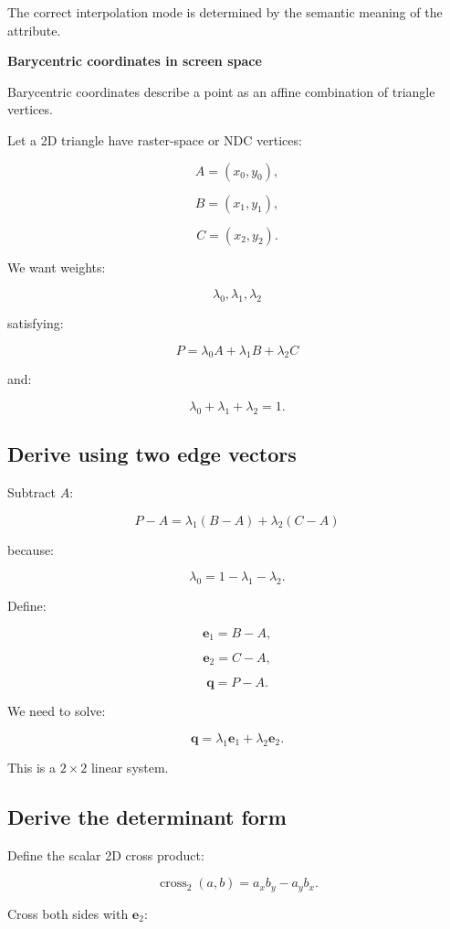 The correct interpolation mode is determined by the semantic meaning of the attribute.

\textbf{Barycentric coordinates in screen space}

Barycentric coordinates describe a point as an affine combination of triangle vertices.

Let a 2D triangle have raster-space or NDC vertices:

\[
 A=(x_0,y_0),
\]

\[
 B=(x_1,y_1),
\]

\[
 C=(x_2,y_2).
\]

We want weights:

\[
 \lambda_0,\lambda_1,\lambda_2
\]

satisfying:

\[
 \boxed{ P=\lambda_0A+\lambda_1B+\lambda_2C }
\]

and:

\[
 \boxed{ \lambda_0+\lambda_1+\lambda_2=1 }.
\]

\subsection{Derive using two edge vectors}\label{02-foundations-ii-ch034-derive-using-two-edge-vectors}

Subtract \(A\):

\[
 P-A= \lambda_1(B-A)+\lambda_2(C-A)
\]

because:

\[
 \lambda_0=1-\lambda_1-\lambda_2.
\]

Define:

\[
 \mathbf e_1=B-A,
\]

\[
 \mathbf e_2=C-A,
\]

\[
 \mathbf q=P-A.
\]

We need to solve:

\[
 \mathbf q= \lambda_1\mathbf e_1+ \lambda_2\mathbf e_2.
\]

This is a \(2\times2\) linear system.

\subsection{Derive the determinant form}\label{02-foundations-ii-ch034-derive-the-determinant-form}

Define the scalar 2D cross product:

\[
 \boxed{ \operatorname{cross}_2(a,b)=a_xb_y-a_yb_x }.
\]

Cross both sides with \(\mathbf e_2\):

